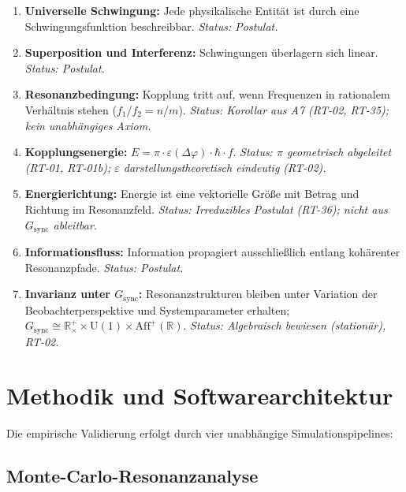 \documentclass[a4paper,11pt]{article}
\begin{document}
	\begin{enumerate}
		\item[A1] \textbf{Universelle Schwingung:}
		Jede physikalische Entit\"at ist durch eine
		Schwingungsfunktion beschreibbar.
		\textit{Status: Postulat.}
		\item[A2] \textbf{Superposition und Interferenz:}
		Schwingungen \"uberlagern sich linear.
		\textit{Status: Postulat.}
		\item[A3] \textbf{Resonanzbedingung:}
		Kopplung tritt auf, wenn Frequenzen in rationalem
		Verh\"altnis stehen ($f_1/f_2 = n/m$).
		\textit{Status: Korollar aus A7 (RT-02, RT-35);
		kein unabh\"angiges Axiom.}
		\item[A4] \textbf{Kopplungsenergie:}
		$E = \pi \cdot \varepsilon(\Delta\varphi)
		\cdot \hbar \cdot f$.
		\textit{Status: $\pi$ geometrisch abgeleitet (RT-01, RT-01b);
		$\varepsilon$ darstellungstheoretisch eindeutig (RT-02).}
		\item[A5] \textbf{Energierichtung:}
		Energie ist eine vektorielle Gr\"o\ss{}e mit Betrag
		und Richtung im Resonanzfeld.
		\textit{Status: Irreduzibles Postulat (RT-36);
		nicht aus $G_{\mathrm{sync}}$ ableitbar.}
		\item[A6] \textbf{Informationsfluss:}
		Information propagiert ausschlie\ss{}lich entlang
		koh\"arenter Resonanzpfade.
		\textit{Status: Postulat.}
		\item[A7] \textbf{Invarianz unter $G_{\mathrm{sync}}$:}
		Resonanzstrukturen bleiben unter Variation der
		Beobachterperspektive und Systemparameter erhalten;
		$G_{\mathrm{sync}} \cong \mathbb{R}^+_\times \times \mathrm{U}(1)
		\times \mathrm{Aff}^+(\mathbb{R})$.
		\textit{Status: Algebraisch bewiesen (station\"ar), RT-02.}
	\end{enumerate}
	
	\section{Methodik und Softwarearchitektur}
	
	Die empirische Validierung erfolgt durch vier unabh\"angige
	Simulationspipelines:
	
	\subsection{Monte-Carlo-Resonanzanalyse}
	
\end{document}
